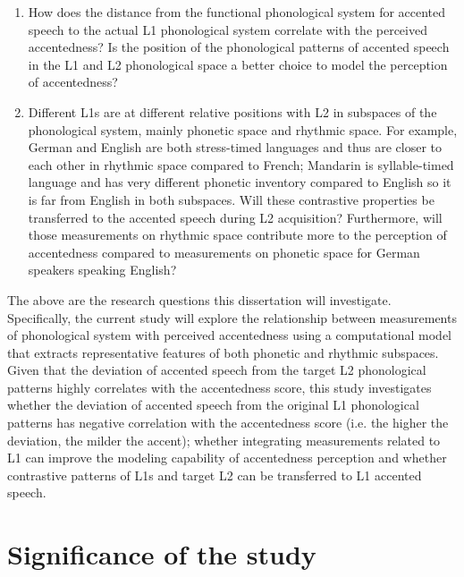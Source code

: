 \begin{enumerate}
\item How does the distance from the functional phonological system for accented speech to the actual L1 phonological system correlate with the perceived accentedness? Is the position of the phonological patterns of accented speech in the L1 and L2 phonological space a better choice to model the perception of accentedness?
\item Different L1s are at different relative positions with L2 in subspaces of the phonological system, mainly phonetic space and rhythmic space. For example, German and English are both stress-timed languages and thus are closer to each other in rhythmic space compared to French; Mandarin is syllable-timed language and has very different phonetic inventory compared to English so it is far from English in both subspaces. Will these contrastive properties be transferred to the accented speech during L2 acquisition? Furthermore, will those measurements on rhythmic space contribute more to the perception of accentedness compared to measurements on phonetic space for German speakers speaking English?
\end{enumerate}

The above are the research questions this dissertation will investigate. Specifically, the current study will explore the relationship between measurements of phonological system with perceived accentedness using a computational model that extracts representative features of both phonetic and rhythmic subspaces. Given that the deviation of accented speech from the target L2 phonological patterns highly correlates with the accentedness score, this study investigates whether the deviation of accented speech from the original L1 phonological patterns has negative correlation with the accentedness score (i.e. the higher the deviation, the milder the accent); whether integrating measurements related to L1 can improve the modeling capability of accentedness perception and whether contrastive patterns of L1s and target L2 can be transferred to L1 accented speech.

\section{Significance of the study}

